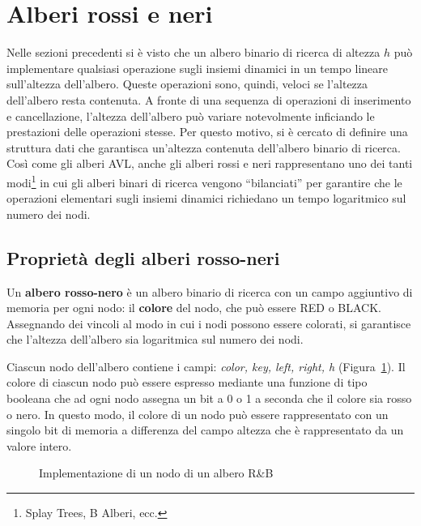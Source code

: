 \section{Alberi rossi e neri}
Nelle sezioni precedenti si è visto che un albero binario di ricerca di altezza $h$ può implementare qualsiasi operazione sugli insiemi dinamici in un tempo lineare sull'altezza dell'albero. Queste operazioni sono, quindi, veloci  se l'altezza dell'albero resta contenuta. A fronte di una sequenza di operazioni di inserimento e cancellazione, l'altezza dell'albero può variare notevolmente inficiando le prestazioni delle operazioni stesse. Per questo motivo, si è cercato di definire una struttura dati che garantisca un'altezza contenuta dell'albero binario di ricerca. Così come gli alberi AVL, anche gli alberi rossi e neri rappresentano uno dei tanti modi\footnote{Splay Trees, B Alberi, ecc.} in cui gli alberi binari di ricerca vengono ``bilanciati'' per garantire che le operazioni elementari sugli insiemi dinamici richiedano un tempo logaritmico sul numero dei nodi.

\subsection{Proprietà degli alberi rosso-neri}
Un \textbf{albero rosso-nero} è un albero binario di ricerca con un campo aggiuntivo di memoria per ogni nodo: il \textbf{colore} del nodo, che può essere \textsc{RED} o \textsc{BLACK}. Assegnando dei vincoli al modo in cui i nodi possono essere colorati, si garantisce che l'altezza dell'albero sia logaritmica sul numero dei nodi.

Ciascun nodo dell'albero contiene i campi: \textit{color, key, left, right, h} (Figura~\ref{fig:rb-node}). Il colore di ciascun nodo può essere espresso mediante una funzione di tipo booleana che ad ogni nodo assegna un bit a 0 o 1 a seconda che il colore sia rosso o nero. In questo modo, il colore di un nodo può essere rappresentato con un singolo bit di memoria a differenza del campo altezza che è rappresentato da un valore intero.

\begin{figure}[ht!]
\centering
{}
\caption{Implementazione di un nodo di un albero R\&B}\label{fig:rb-node}
\end{figure}

